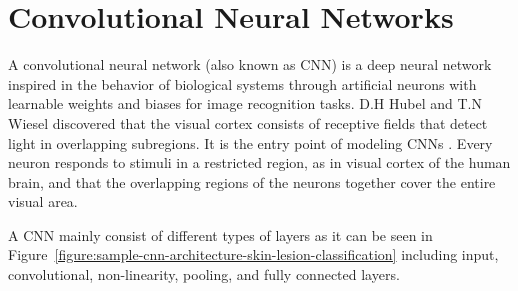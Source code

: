 \section{Convolutional Neural Networks}

    A convolutional neural network (also known as CNN) is a deep neural network inspired in the behavior of biological systems through artificial neurons with learnable weights and biases for image recognition tasks.
    D.H Hubel and T.N Wiesel discovered that the visual cortex consists of receptive fields that detect light in overlapping subregions.
    It is the entry point of modeling CNNs \cite{hubel1968receptive}.
    Every neuron responds to stimuli in a restricted region, as in visual cortex of the human brain, and that the overlapping regions of the neurons together cover the entire visual area.

    

    A CNN mainly consist of different types of layers as it can be seen in Figure~\ref{figure:sample-cnn-architecture-skin-lesion-classification} including input, convolutional, non-linearity, pooling, and fully connected layers.

